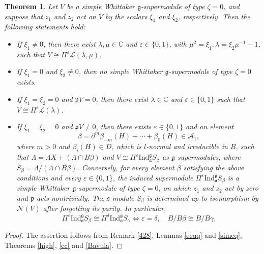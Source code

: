 \documentclass[a4paper,10pt]{article}
\theoremstyle{definition}
\theoremstyle{plain}
\newtheorem{theorem}[definition]{Theorem}
\theoremstyle{remark}
\theoremstyle{mystyle}
\numberwithin{equation}{section}
\begin{document}
\begin{theorem}\label{3.38}
    Let \(V\) be a simple Whittaker \(\mathfrak g\)-supermodule of type \(\zeta=0\), and suppose that \(z_1\) and $z_2$ act on \(V\) by the scalars $\xi_1$ and $\xi_2$, respectively. Then the following statements hold:
    \begin{itemize}
        \item[(1).] If $\xi_1\neq 0$, then there exist \(\lambda,\mu\in\mathbb C\) and $\varepsilon\in \{0,1\}$, with \(\mu^2=\xi_1,\lambda=\xi_2\mu^{-1}-1\), such that \(V\cong \Pi^{\varepsilon}\mathcal L(\lambda,\mu)\).
        \item[(2).] If $\xi_1=0$ and $\xi_2\neq 0$, then no simple Whittaker $\mathfrak g$-supermodule of type $\zeta=0$ exists.
        \item[(3).] If $\xi_1=\xi_2=0$ and \(\mathfrak pV=0\), then there exist $\lambda\in \mathbb C$ and $\varepsilon\in \{0,1\}$ such that $V\cong \Pi^{\varepsilon}\mathcal L(\lambda)$.
        \item[(4).] If $\xi_1=\xi_2=0$ and \(\mathfrak pV\neq0\), then there exists \(\varepsilon\in\{0,1\}\) and an element
        \[
            \beta=\partial^m\beta_{-m}(H)+\cdots+\beta_0(H)\in \mathcal{A}_1,
        \]
        where \(m>0\) and \(\beta_i(H)\in D\), which is $l$-normal and irreducible in $B$, such that $\Lambda=\Lambda X+(\Lambda\cap B\beta)$ and $V\cong\Pi^\varepsilon \mathrm{Ind}_{\mathfrak a}^{\mathfrak g}S_{\beta}$ as $\mathfrak g$-supermodules, where $S_{\beta}=\Lambda/(\Lambda\cap B\beta )$. Conversely, for every element \(\beta\) satisfying the above conditions and every \(\varepsilon\in\{0,1\}\), the induced supermodule \(\Pi^\varepsilon \mathrm{Ind}_{\mathfrak a}^{\mathfrak g}S_{\beta}\) is a simple Whittaker \(\mathfrak g\)-supermodule of type \(\zeta=0\), on which \(z_1\) and \(z_2\) act by zero and \(\mathfrak p\) acts nontrivially. The $\mathfrak s$-module \(S_\beta\) is determined up to isomorphism by \(\mathcal N(V)\) after forgetting its parity. In particular, 
        $$
        \Pi^\varepsilon \mathrm{Ind}_{\mathfrak a}^{\mathfrak g}S_{\beta}\cong \Pi^\delta \mathrm{Ind}_{\mathfrak a}^{\mathfrak g}S_{\gamma}\iff \varepsilon=\delta,\quad B/B\beta\cong B/B\gamma.
        $$
    \end{itemize}
\end{theorem}
\begin{proof}
    The assertion follows from Remark \ref{428}, Lemmas \ref{eeqq} and \ref{simeq}, Theorems \ref{high}, \ref{cc} and \ref{Bavula}.
\end{proof}
\bigskip
\end{document}
